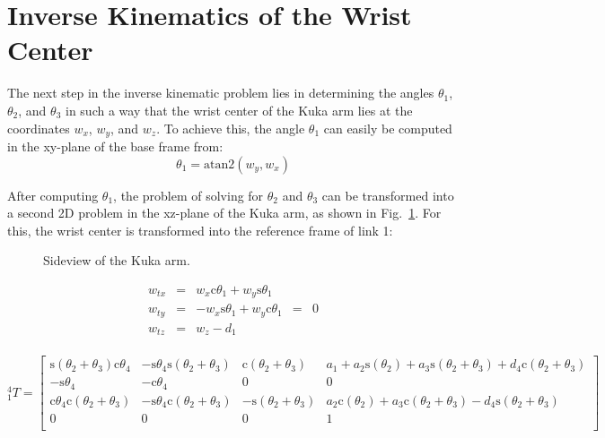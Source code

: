\documentclass[twoside]{article}
\renewcommand{\c}{\text{c}}
\newcommand{\s}{\text{s}}
\newcommand{\T}[2]{\mbox{$_{#2}^{#1}{T}$}}
\newcommand{\figref}[1]{Fig.~\ref{fig:#1}}
\begin{document}
\section{Inverse Kinematics of the Wrist Center}
The next step in the inverse kinematic problem lies in determining the angles
$\theta_1$, $\theta_2$, and $\theta_3$ in such a way that the wrist center of the Kuka arm
lies at the coordinates $w_x$, $w_y$, and $w_z$. To achieve this, the angle $\theta_1$
can easily be computed in the xy-plane of the base frame from:
\begin{equation}
  \theta_1 = \text{atan2}(w_y, w_x)
\end{equation}

After computing $\theta_1$, the problem of solving for $\theta_2$ and $\theta_3$ can be
transformed into a second 2D problem in the xz-plane of the Kuka arm, as shown in \figref{sideview}.
For this, the wrist center is transformed into the reference frame of link 1:
\begin{figure}[ht]
  \centering
  \caption{Sideview of the Kuka arm.}
  \label{fig:sideview}
\end{figure}

\begin{equation}
\begin{matrix}
  w_{tx} & = & w_x \c\theta_1 + w_y \s\theta_1 & &\\
  w_{ty} & = & - w_x  \s\theta_1 + w_y \c\theta_1 & = &0\\
  w_{tz} & = & w_z - d_1&& \\
\end{matrix}
\end{equation}

\begin{equation*}
\T{4}{1} =
\begin{bmatrix}
  \s(\theta_2 + \theta_3)\c\theta_4 & -\s\theta_4\s(\theta_2 + \theta_3) & \c(\theta_2 + \theta_3) & a_1 + a_2\s(\theta_2) + a_3\s(\theta_2 + \theta_3) + d_4\c(\theta_2 + \theta_3) \\
  -\s\theta_4 & -\c\theta_4 & 0 & 0 \\
  \c\theta_4\c(\theta_2 + \theta_3) & -\s\theta_4\c(\theta_2 + \theta_3) & -\s(\theta_2 + \theta_3) & a_2\c(\theta_2) + a_3\c(\theta_2 + \theta_3) - d_4\s(\theta_2 + \theta_3) \\
  0 & 0 & 0 & 1\\
\end{bmatrix}
\label{eq:t41}
\end{equation*}
\end{document}
